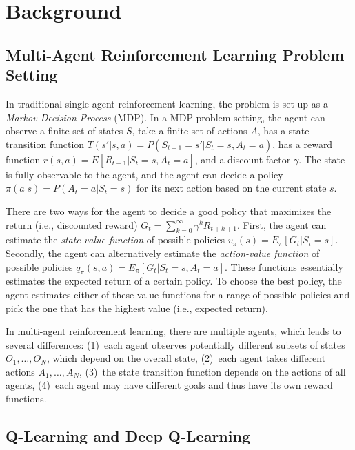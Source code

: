 
\section{Background}
\label{sec:background}

\subsection{Multi-Agent Reinforcement Learning Problem Setting}

In traditional single-agent reinforcement learning, the problem is set up as a
\emph{Markov Decision Process} (MDP). In a MDP problem setting, the agent can observe
a finite set of states $S$, take a finite set of actions $A$, has a state
transition function $T(s'|s,a) = P(S_{t+1}=s'|S_t=s, A_t=a)$, has a reward
function $r(s,a) = E[R_{t+1}|S_t=s, A_t=a]$, and a discount factor $\gamma$.
The state is fully observable to the agent, and the agent can decide a policy
$\pi(a|s) = P(A_t=a | S_t=s)$ for its next action based on the current state
$s$.

There are two ways for the agent to decide a good policy that maximizes the
return (i.e., discounted reward) $G_t = \sum_{k=0}^\infty \gamma^k R_{t+k+1}$.
First, the agent can estimate the \emph{state-value function} of possible policies
$v_\pi(s) = E_\pi[G_t|S_t=s]$. Secondly, the agent can alternatively
estimate the \emph{action-value function} of possible policies
$q_\pi(s,a) = E_\pi[G_t|S_t=s, A_t=a]$. These functions essentially estimates
the expected return of a certain policy. To choose the best policy, the agent
estimates either of these value functions for a range of possible policies and
pick the one that has the highest value (i.e., expected return).

In multi-agent reinforcement learning, there are multiple agents, which leads
to several differences: (1)~each agent observes potentially different subsets
of states $O_1,\ldots,O_N$, which depend on the overall state, (2)~each agent
takes different actions $A_1,\ldots,A_N$, (3)~the state transition function
depends on the actions of all agents, (4)~each agent may have different goals
and thus have its own reward functions.

\subsection{Q-Learning and Deep Q-Learning}



